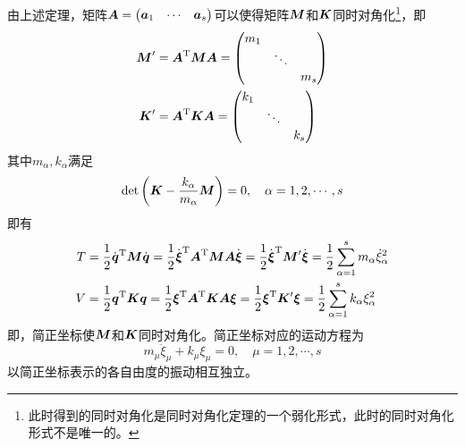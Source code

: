 由上述定理，矩阵$\boldsymbol{A} = \begin{pmatrix} \boldsymbol{a}_1 & \cdots & \boldsymbol{a}_s \end{pmatrix}$可以使得矩阵$\boldsymbol{M}$和$\boldsymbol{K}$同时对角化\footnote{此时得到的同时对角化是同时对角化定理的一个弱化形式，此时的同时对角化形式不是唯一的。}，即
\begin{align*}
	\boldsymbol{M}' & = \boldsymbol{A}^{\mathrm{T}} \boldsymbol{M} \boldsymbol{A} = \begin{pmatrix} m_1 & & \\ & \ddots & \\ & & m_s \end{pmatrix} \\
	\boldsymbol{K}' & = \boldsymbol{A}^{\mathrm{T}} \boldsymbol{K} \boldsymbol{A} = \begin{pmatrix} k_1 & & \\ & \ddots & \\ & & k_s \end{pmatrix}
\end{align*}
其中$m_\alpha,k_\alpha$满足
\begin{equation*}
	\det\left(\boldsymbol{K}-\frac{k_\alpha}{m_\alpha} \boldsymbol{M}\right) = 0,\quad \alpha = 1,2,\cdots,s
\end{equation*}
即有
\begin{align*}
	T & = \frac12 \dot{\boldsymbol{q}}^{\mathrm{T}} \boldsymbol{M} \dot{\boldsymbol{q}} = \frac12 \dot{\boldsymbol{\xi}}^{\mathrm{T}} \boldsymbol{A}^{\mathrm{T}} \boldsymbol{M} \boldsymbol{A} \dot{\boldsymbol{\xi}} = \frac12 \dot{\boldsymbol{\xi}}^{\mathrm{T}} \boldsymbol{M}' \dot{\boldsymbol{\xi}} = \frac12 \sum_{\alpha=1}^s m_\alpha \dot{\xi}_\alpha^2 \\
	V & = \frac12 \boldsymbol{q}^{\mathrm{T}} \boldsymbol{K} \boldsymbol{q} = \frac12 \boldsymbol{\xi}^{\mathrm{T}} \boldsymbol{A}^{\mathrm{T}} \boldsymbol{K} \boldsymbol{A} \boldsymbol{\xi} = \frac12 \boldsymbol{\xi}^{\mathrm{T}} \boldsymbol{K}' \boldsymbol{\xi} = \frac12 \sum_{\alpha=1}^s k_\alpha \xi_\alpha^2
\end{align*}
即，简正坐标使$\boldsymbol{M}$和$\boldsymbol{K}$同时对角化。简正坐标对应的运动方程为
\begin{equation*}
	m_\mu \ddot{\xi}_\mu + k_\mu \xi_\mu = 0,\quad \mu=1,2,\cdots,s
\end{equation*}
以简正坐标表示的各自由度的振动相互独立。

